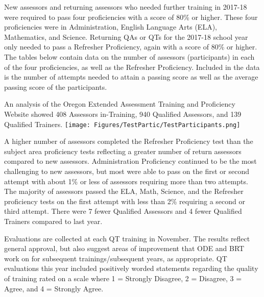 \documentclass[]{article}
\begin{document}
New assessors and returning assessors who needed further training in
2017-18 were required to pass four proficiencies with a score of 80\% or
higher. These four proficiencies were in Administration, English
Language Arts (ELA), Mathematics, and Science. Returning QAs or QTs for
the 2017-18 school year only needed to pass a Refresher Proficiency,
again with a score of 80\% or higher. The tables below contain data on
the number of assessors (participants) in each of the four
proficiencies, as well as the Refresher Proficiency. Included in the
data is the number of attempts needed to attain a passing score as well
as the average passing score of the participants.

An analysis of the Oregon Extended Assessment Training and Proficiency
Website showed 408 Assessors in-Training, 940 Qualified Assessors, and
139 Qualified Trainers. \FloatBarrier
\texttt{[image: Figures/TestPartic/TestParticipants.png]}

A higher number of assessors completed the Refresher Proficiency test
than the subject area proficiency tests reflecting a greater number of
return assessors compared to new assessors. Administration Proficiency
continued to be the most challenging to new assessors, but most were
able to pass on the first or second attempt with about 1\% or less of
assessors requiring more than two attempts. The majority of assessors
passed the ELA, Math, Science, and the Refresher proficiency tests on
the first attempt with less than 2\% requiring a second or third
attempt. There were 7 fewer Qualified Assessors and 4 fewer Qualified
Trainers compared to last year.

Evaluations are collected at each QT training in November. The results
reflect general approval, but also suggest areas of improvement that ODE
and BRT work on for subsequent trainings/subsequent years, as
appropriate. QT evaluations this year included positively worded
statements regarding the quality of training rated on a scale where 1 =
Strongly Disagree, 2 = Disagree, 3 = Agree, and 4 = Strongly Agree.
\end{document}
